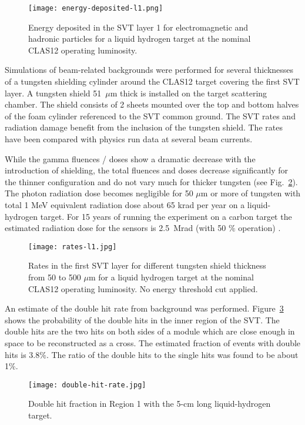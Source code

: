 \begin{figure}[hbt] 
\centering 
\texttt{[image: energy-deposited-l1.png]}
\caption{Energy deposited in the SVT layer 1 for electromagnetic and hadronic particles for a liquid hydrogen target at the nominal CLAS12 operating luminosity.}
\label{fig:energy-deposited-l1}
\end{figure}

Simulations of beam-related backgrounds were performed for several thicknesses of a tungsten shielding cylinder around the CLAS12 target covering the first SVT layer. A tungsten shield 51~$\mu$m thick is installed on the target scattering chamber. The shield consists of 2 sheets mounted over the top and bottom halves of the foam cylinder referenced to the SVT common ground. The SVT rates and radiation damage benefit from the inclusion of the tungsten shield. The rates have been compared with physics run data at several beam currents.

While the gamma fluences / doses show a dramatic decrease with the introduction of shielding, the total fluences and doses decrease significantly for the thinner configuration and do not vary much for thicker tungsten (see Fig.~\ref{fig:rates-l1}). The photon radiation dose becomes negligible for 50 $\mu$m or more of tungsten with total 1 MeV equivalent radiation dose about 65 krad per year on a liquid-hydrogen target. For 15 years of running the experiment on a carbon target the estimated radiation dose for the sensors is 2.5~Mrad (with 50 $\%$ operation) \cite{TDRSVT}. 

\begin{figure}[hbt] 
\centering 
\texttt{[image: rates-l1.jpg]}
\caption{Rates in the first SVT layer for different tungsten shield thickness from 50 to 500 $\mu$m for a liquid hydrogen target at the nominal CLAS12 operating luminosity. No energy threshold cut applied.}
\label{fig:rates-l1}
\end{figure}

An estimate of the double hit rate from background was performed. Figure~\ref{fig:double-hit-rate} shows the probability of the double hits in the inner region of the SVT. The double hits are the two hits on both sides of a module which are close enough in space to be reconstructed as a cross. The estimated fraction of events with double hits is 3.8$\%$. The ratio of the double hits to the single hits was found to be about 1$\%$.

\begin{figure}[hbt] 
\centering 
\texttt{[image: double-hit-rate.jpg]}
\caption{Double hit fraction in Region 1 with the 5-cm long liquid-hydrogen target.}
\label{fig:double-hit-rate}
\end{figure}

